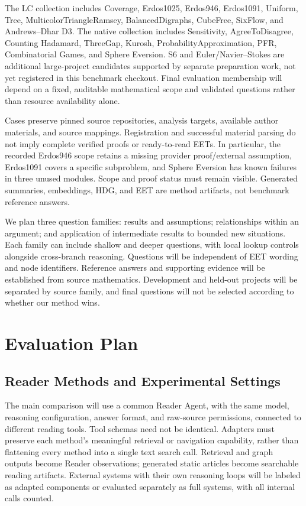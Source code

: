 \documentclass{article}
\begin{document}
The LC collection includes Coverage, Erdos1025, Erdos946, Erdos1091, Uniform, Tree, MulticolorTriangleRamsey, BalancedDigraphs, CubeFree, SixFlow, and Andrews--Dhar D3. The native collection includes Sensitivity, AgreeToDisagree, Counting Hadamard, ThreeGap, Kurosh, ProbabilityApproximation, PFR, Combinatorial Games, and Sphere Eversion. S6 and Euler/Navier--Stokes are additional large-project candidates supported by separate preparation work, not yet registered in this benchmark checkout. Final evaluation membership will depend on a fixed, auditable mathematical scope and validated questions rather than resource availability alone.

Cases preserve pinned source repositories, analysis targets, available author materials, and source mappings. Registration and successful material parsing do not imply complete verified proofs or ready-to-read EETs. In particular, the recorded Erdos946 scope retains a missing provider proof/external assumption, Erdos1091 covers a specific subproblem, and Sphere Eversion has known failures in three unused modules. Scope and proof status must remain visible. Generated summaries, embeddings, HDG, and EET are method artifacts, not benchmark reference answers.

We plan three question families: results and assumptions; relationships within an argument; and application of intermediate results to bounded new situations. Each family can include shallow and deeper questions, with local lookup controls alongside cross-branch reasoning. Questions will be independent of EET wording and node identifiers. Reference answers and supporting evidence will be established from source mathematics. Development and held-out projects will be separated by source family, and final questions will not be selected according to whether our method wins.

\section{Evaluation Plan}
\label{sec:evaluation}
\subsection{Reader Methods and Experimental Settings}
The main comparison will use a common Reader Agent, with the same model, reasoning configuration, answer format, and raw-source permissions, connected to different reading tools. Tool schemas need not be identical. Adapters must preserve each method's meaningful retrieval or navigation capability, rather than flattening every method into a single text search call. Retrieval and graph outputs become Reader observations; generated static articles become searchable reading artifacts. External systems with their own reasoning loops will be labeled as adapted components or evaluated separately as full systems, with all internal calls counted.
\end{document}
